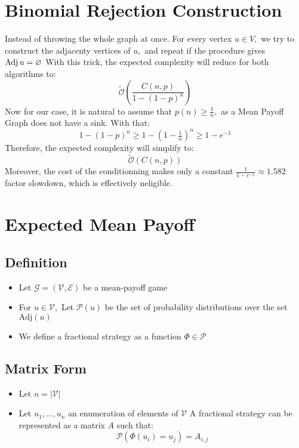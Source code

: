 \section{Binomial Rejection Construction}
Instead of throwing the whole graph at once. For every vertex $u\in V,$ we try to construct the adjacenty vertices of $u,$ and repeat if the procedure gives $\operatorname{Adj} u =\varnothing$
\newline With this trick, the expected complexity will reduce for both algorithms to:
$$
\tilde{\mathcal{O}}\left(\frac{C(n,p)}{1-(1-p)^n}\right)
$$
Now for our case, it is natural to assume that $p(n) \ge \frac{1}{n},$ as a Mean Payoff Graph does not have a sink. With that: 
$$
1-(1-p)^n \ge 1-(1-\tfrac{1}{n})^n \ge 1-e^{-1}
$$
Therefore, the expected complexity will simplify to:
$$
\tilde{\mathcal{O}}\left(C(n,p)\right)
$$
Moreover, the cost of the conditionning makes only a constant $\frac{1}{1-e^{-1}}\approx 1.582$ factor slowdown, which is effectively neligible.

\section{Expected Mean Payoff}
\subsection{Definition}
\begin{itemize}
	\item Let $\mathcal{G}=(\mathcal{V},\mathcal{E})$ be a mean-payoff game
	\item For $u\in\mathcal{V},$ Let $\mathscr{P}(u)$ be the set of probability distributions over the set $\text{Adj}(u)$
	\item We define a fractional strategy as a function $\Phi\in \mathscr{P}$

\end{itemize}


\subsection{Matrix Form}
\begin{itemize}
	\item Let $n=\lvert \mathcal{V}\rvert$
	\item Let $u_1,\dots,u_n$ an enumeration of elements of $\mathcal{V}$
	A fractional strategy can be represented as a matrix $A$ such that:
	$$
	\mathcal{P}(\Phi(u_i)=u_j)=A_{i,j}
	$$
\end{itemize}

